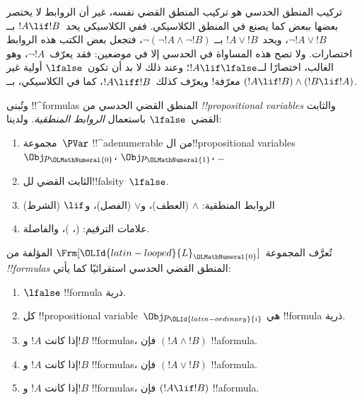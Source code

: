 \documentclass[../../../include/open-logic-section]{subfiles}
\begin{document}


تركيب المنطق الحدسي هو تركيب المنطق القضي نفسه، غير أن الروابط لا يختصر
بعضها ببعض كما يصنع في المنطق الكلاسيكي. ففي الكلاسيكي يحد~$!A \lif !B$
بــ$\lnot !A \lor !B$، ويحد~$!A \lor !B$ بــ
$\lnot(\lnot !A \land \lnot !B)$، فتجعل بعض الكتب هذه الروابط اختصارات.
ولا تصح هذه المساواة في الحدسي إلا في موضعين: فقد يعرّف~$\lnot !A$، وهو
الغالب، اختصارًا لــ$!A \lif \lfalse$؛ وعند ذلك لا بد أن تكون~$\lfalse$
أولية غير معرّفة!{} ويعرّف كذلك~$!A \liff !B$، كما في الكلاسيكي، بــ
$(!A \lif !B) \land (!B \lif !A)$.

وتُبنى !!^{formula}s المنطق القضي الحدسي من
\emph{!!{propositional variable}s} والثابت القضي~$\lfalse$ باستعمال
\emph{الروابط المنطقية}. ولدينا:

\begin{enumerate}
\item مجموعة~$\PVar$ !!^a{denumerable} من ال!!{propositional variable}s
  $\Obj p_{\OLMathNumeral{0}}$، $\Obj p_{\OLMathNumeral{1}}$، \dots
  \item الثابت القضي لل!!{falsity}~$\lfalse$.
\item الروابط المنطقية: $\land$
  (العطف)، و$\lor$ (الفصل)، و$\lif$ (الشرط)
\item علامات الترقيم: (، )، والفاصلة.
\end{enumerate}

\begin{defn}[الصيغة]
 تُعرَّف المجموعة~$\Frm[{\OLId{latin-looped}{L}}_{\OLMathNumeral{0}}]$ المؤلفة من
\emph{!!{formula}s} المنطق القضي الحدسي استقرائيًا كما يأتي:
\begin{enumerate}
\item $\lfalse$ !!{formula} ذرية.

\item كل !!{propositional variable}~$\Obj p_{\OLId{latin-ordinary}{i}}$ هي !!{formula} ذرية.

\item إذا كانت $!A$ و$!B$ !!{formula}s، فإن $(!A \land
  !B)$ !!a{formula}.

\item إذا كانت $!A$ و$!B$ !!{formula}s، فإن $(!A \lor !B)$
  !!a{formula}.

\item إذا كانت $!A$ و$!B$ !!{formula}s، فإن $(!A \lif !B)$
  !!a{formula}.

\end{enumerate}
\end{defn}
\end{document}
